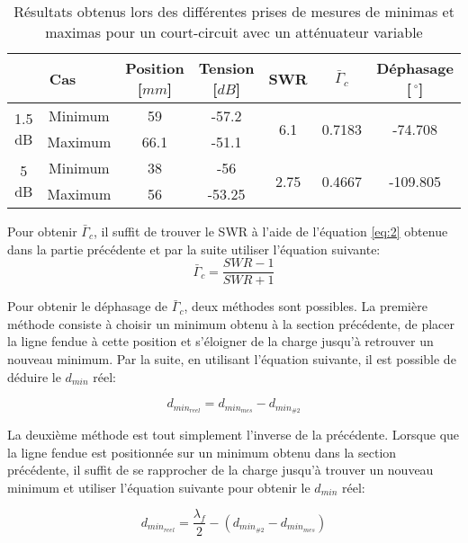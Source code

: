 \begin{table}[htbp]
    \centering
    \begin{tabular}{|c|c||c|c|c|c|c|} \hline
    \multicolumn{2}{|c||}{Cas} & Position [$mm$] & Tension [$dB$] & SWR & $\bar{\Gamma}_c$ & Déphasage [$\,^{\circ}$]\\ \hline \hline 
    \multirow{2}{*}{1.5 dB} & Minimum & 59 & -57.2 & \multirow{2}{*}{6.1} & \multirow{2}{*}{0.7183} & \multirow{2}{*}{-74.708}\\ 
 & Maximum & 66.1 & -51.1 & &  & \\ \hline
\multirow{2}{*}{5 dB} & Minimum & 38 & -56 & \multirow{2}{*}{2.75} & \multirow{2}{*}{0.4667} & \multirow{2}{*}{-109.805}\\ 
 & Maximum & 56 & -53.25 & &  & \\ \hline
    \end{tabular}%
        \caption{Résultats obtenus lors des différentes prises de mesures de minimas et maximas pour un court-circuit avec un atténuateur variable}
    \label{tab:3}%
\end{table}%

Pour obtenir $\bar{\Gamma}_c$, il suffit de trouver le SWR à l'aide de l'équation \ref{eq:2} obtenue dans la partie précédente et par la suite utiliser l'équation suivante:
\begin{equation}
    \bar{\Gamma}_c = \frac{SWR - 1}{SWR + 1}
\end{equation}

 Pour obtenir le déphasage de $\bar{\Gamma}_c$, deux méthodes sont possibles. La première méthode consiste à choisir un minimum obtenu à la section précédente, de placer la ligne fendue à cette position et s'éloigner de la charge jusqu'à retrouver un nouveau minimum. Par la suite, en utilisant l'équation suivante, il est possible de déduire le $d_{min}$ réel:

\begin{equation}
    d_{min_{reel}} = d_{min_{mes}} - d_{min_{\#2}} 
\end{equation}

La deuxième méthode est tout simplement l'inverse de la précédente. Lorsque que la ligne fendue est positionnée sur un minimum obtenu dans la section précédente, il suffit de se rapprocher de la charge jusqu'à trouver un nouveau minimum et utiliser l'équation suivante pour obtenir le $d_{min}$ réel:

\begin{equation}
    d_{min_{reel}} = \frac{\lambda_f}{2} - (d_{min_{\#2}} - d_{min_{mes}}) 
\end{equation}


